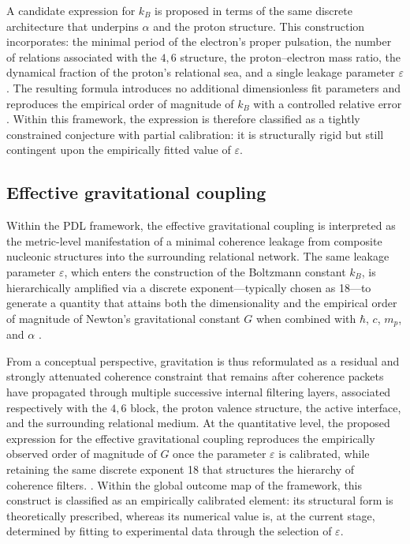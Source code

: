 \documentclass{article}
\begin{document}
A candidate expression for \(k_B\) is proposed in terms of the same discrete architecture that underpins \(\alpha\) and the proton structure. This construction incorporates: the minimal period of the electron’s proper pulsation, the number of relations associated with the \(4,6\) structure, the proton–electron mass ratio, the dynamical fraction of the proton’s relational sea, and a single leakage parameter \(\varepsilon\). The resulting formula introduces no additional dimensionless fit parameters and reproduces the empirical order of magnitude of \(k_B\) with a controlled relative error
\cite{PDL_Main_2026,Coherence_Leakage_18_2026}. Within this framework, the expression is therefore classified as a tightly constrained conjecture with partial calibration: it is structurally rigid but still contingent upon the empirically fitted value of \(\varepsilon\).

\subsection{Effective gravitational coupling}
\label{subsec:gravity_constant}

Within the PDL framework, the effective gravitational coupling is interpreted as the metric-level manifestation of a minimal coherence leakage from composite nucleonic structures into the surrounding relational network. The same leakage parameter \(\varepsilon\), which enters the construction of the Boltzmann constant \(k_B\), is hierarchically amplified via a discrete exponent—typically chosen as 18—to generate a quantity that attains both the dimensionality and the empirical order of magnitude of Newton’s gravitational constant \(G\) when combined with \(\hbar\), \(c\), \(m_p\), and \(\alpha\)
\cite{PDL_Main_2026,Exponent_18_PDL_2026,PDL_position}.

From a conceptual perspective, gravitation is thus reformulated as a residual and strongly attenuated coherence constraint that remains after coherence packets have propagated through multiple successive internal filtering layers, associated respectively with the \(4,6\) block, the proton valence structure, the active interface, and the surrounding relational medium. At the quantitative level, the proposed expression for the effective gravitational coupling reproduces the empirically observed order of magnitude of \(G\) once the parameter \(\varepsilon\) is calibrated, while retaining the same discrete exponent 18 that structures the hierarchy of coherence filters.
\cite{Exponent_18_PDL_2026,Coherence_Leakage_18_2026}. Within the global outcome map of the framework, this construct is classified as an empirically calibrated element: its structural form is theoretically prescribed, whereas its numerical value is, at the current stage, determined by fitting to experimental data through the selection of \(\varepsilon\).
\end{document}
